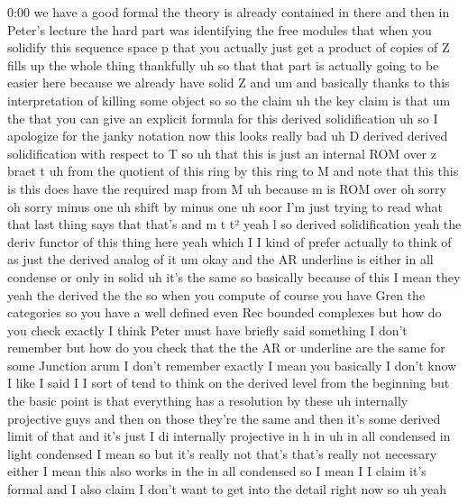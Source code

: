 \begin{unfinished}{0:00}
we  have  a  good  formal  the  theory  is
already  contained  in  there  and  then  in
Peter's  lecture  the  hard  part  was
identifying  the  free  modules  that  when
you  solidify  this  sequence  space  p  that
you  actually  just  get  a  product  of
copies  of  Z  fills  up  the  whole
thing  thankfully  uh  so  that  that  part  is
actually  going  to  be  easier  here  because
we  already  have  solid  Z  and  um  and
basically  thanks  to  this  interpretation
of  killing  some
object  so
so  the  claim  uh  the  key  claim  is
that
um  the  that  you  can  give  an  explicit
formula  for  this  derived
solidification  uh
so  I  apologize  for  the  janky  notation
now  this  looks  really  bad  uh  D  derived
derived  solidification  with  respect  to  T
so  uh  that  this  is  just  an  internal  ROM
over  z  braet
t  uh
from  the  quotient  of  this  ring  by  this
ring  to
M  and  note  that
this  this  is  this  does  have  the  required
map  from  M  uh  because  m  is
ROM  over  oh
sorry  oh  sorry  minus  one  uh  shift  by
minus  one
uh  soor  I'm  just  trying  to  read  what
that  last  thing  says  that  that's  and  m  t
t²  yeah  l  so  derived  solidification  yeah
the  deriv  functor  of  this  thing  here
yeah  which  I  I  kind  of  prefer  actually
to  think  of  as  just  the  derived  analog
of  it
um
okay
and  the  AR  underline  is  either  in  all
condense  or  only  in
solid  uh  it's  the  same  so  basically
because  of
this  I  mean  they  yeah  the  derived  the
the  so  when  you  compute  of  course  you
have  Gren  the  categories  so  you  have  a
well  defined  even  Rec  bounded  complexes
but  how  do  you  check  exactly  I  think
Peter  must  have  briefly  said  something  I
don't  remember  but  how  do  you  check  that
the  the  AR  or  underline  are  the  same
for  some  Junction  arum  I  don't  remember
exactly  I  mean  you  basically  I  don't
know
I  like  I  said  I  I  sort  of  tend  to  think
on  the  derived  level  from  the  beginning
but  the  basic  point  is  that  everything
has  a  resolution  by
these  uh  internally  projective  guys  and
then  on  those  they're  the  same  and  then
it's  some  derived  limit  of  that  and  it's
just  I  di  internally  projective  in  h  in
uh  in  all  condensed  in  light  condensed  I
mean  so  but  it's  really  not  that's
that's  really  not  necessary  either  I
mean  this  also  works  in  the  in  all
condensed  so  I  mean  I  I  claim  it's
formal  and  I  also  claim  I  don't  want  to
get  into  the  detail  right  now  so  uh  yeah

\end{unfinished}
